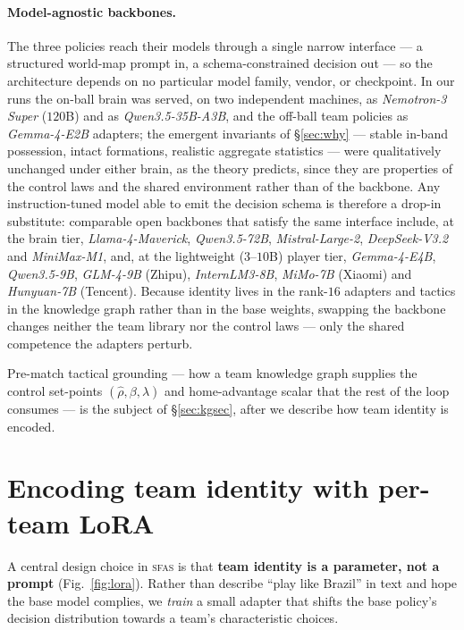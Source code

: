 \documentclass[11pt]{article}
\theoremstyle{definition}
\theoremstyle{remark}
\newcommand{\sfas}{\textsc{sfas}}
\begin{document}
\paragraph{Model-agnostic backbones.} The three policies reach their models through a single narrow interface --- a structured world-map prompt in, a schema-constrained decision out --- so the architecture depends on no particular model family, vendor, or checkpoint. In our runs the on-ball brain was served, on two independent machines, as \emph{Nemotron-3 Super} ($120$B) and as \emph{Qwen3.5-35B-A3B}, and the off-ball team policies as \emph{Gemma-4-E2B} adapters; the emergent invariants of \S\ref{sec:why} --- stable in-band possession, intact formations, realistic aggregate statistics --- were qualitatively unchanged under either brain, as the theory predicts, since they are properties of the control laws and the shared environment rather than of the backbone. Any instruction-tuned model able to emit the decision schema is therefore a drop-in substitute: comparable open backbones that satisfy the same interface include, at the brain tier, \emph{Llama-4-Maverick}, \emph{Qwen3.5-72B}, \emph{Mistral-Large-2}, \emph{DeepSeek-V3.2} and \emph{MiniMax-M1}, and, at the lightweight ($3$--$10$B) player tier, \emph{Gemma-4-E4B}, \emph{Qwen3.5-9B}, \emph{GLM-4-9B} (Zhipu), \emph{InternLM3-8B}, \emph{MiMo-7B} (Xiaomi) and \emph{Hunyuan-7B} (Tencent). Because identity lives in the rank-$16$ adapters and tactics in the knowledge graph rather than in the base weights, swapping the backbone changes neither the team library nor the control laws --- only the shared competence the adapters perturb.

Pre-match tactical grounding --- how a team knowledge graph supplies the control set-points $(\hat\rho,\beta,\lambda)$ and home-advantage scalar that the rest of the loop consumes --- is the subject of \S\ref{sec:kgsec}, after we describe how team identity is encoded.

\section{Encoding team identity with per-team LoRA}\label{sec:lora}

A central design choice in \sfas{} is that \textbf{team identity is a parameter, not a prompt} (Fig.~\ref{fig:lora}). Rather than describe ``play like Brazil'' in text and hope the base model complies, we \emph{train} a small adapter that shifts the base policy's decision distribution towards a team's characteristic choices.
\end{document}

